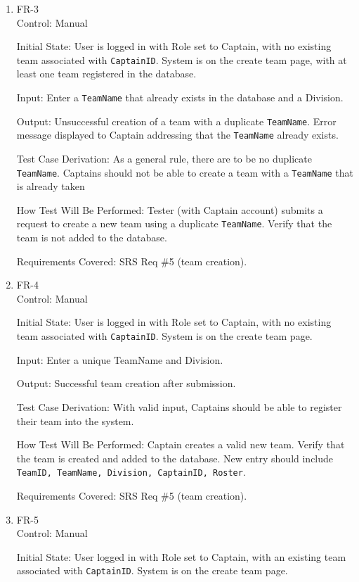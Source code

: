 \documentclass[12pt, titlepage]{article}
\begin{document}
\begin{enumerate}

\item{FR-3\\}
Control: Manual

Initial State: User is logged in with Role set to Captain, with no existing team associated with \texttt{CaptainID}. System is on the create team page, with at least one team registered in the database.

Input: Enter a \texttt{TeamName} that already exists in the database and a Division.

Output: Unsuccessful creation of a team with a duplicate \texttt{TeamName}. Error message displayed to Captain addressing that the \texttt{TeamName} already exists.

Test Case Derivation: As a general rule, there are to be no duplicate \texttt{TeamName}. Captains should not be able to create a team with a \texttt{TeamName} that is already taken

How Test Will Be Performed: Tester (with Captain account) submits a request to create a new team using a duplicate \texttt{TeamName}. Verify that the team is not added to the database.

Requirements Covered: SRS Req \#5 (team creation).

\item{FR-4\\}
Control: Manual

Initial State: User is logged in with Role set to Captain, with no existing team associated with \texttt{CaptainID}. System is on the create team page.

Input: Enter a unique TeamName and Division.

Output: Successful team creation after submission.

Test Case Derivation: With valid input, Captains should be able to register their team into the system.

How Test Will Be Performed: Captain creates a valid new team. Verify that the team is created and added to the database. New entry should include \texttt{TeamID, TeamName, Division, CaptainID, Roster}.

Requirements Covered: SRS Req \#5 (team creation).

\item{FR-5\\}
Control: Manual

Initial State: User logged in with Role set to Captain, with an existing team associated with \texttt{CaptainID}. System is on the create team page.


\end{enumerate}
\end{document}
